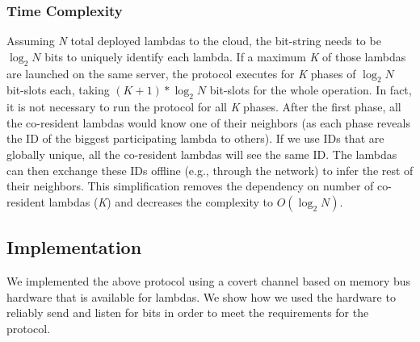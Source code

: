 \subsubsection{Time Complexity}
\label{sec:protocol:complexity}
Assuming \textit{N} total deployed lambdas to the cloud, the bit-string needs
to be $\log_2N$ bits to uniquely identify each lambda. If a maximum \textit{K}
of those lambdas are launched on the same server, the protocol executes for
\textit{K} phases of $\log_2N$ bit-slots each, taking $(K+1)*\log_2N$ bit-slots
for the whole operation.  In fact, it is not necessary to run the protocol for all \textit{K}
phases. After the first phase, all the co-resident lambdas would know one of
their neighbors (as each phase reveals the ID of the biggest participating
lambda to others).  If we use IDs that are globally unique, all the
co-resident lambdas will see the same ID. The lambdas can then exchange these IDs
offline (e.g., through the network) to infer the rest of their neighbors. This
simplification removes the dependency on number of co-resident lambdas
(\textit{K}) and decreases the complexity to $O(\log_2N)$.




\subsection{Implementation}
\label{sec:method:impl}
We implemented the above protocol using a covert channel based on memory bus hardware 
that is available for lambdas. We show how we used the hardware to reliably send and 
listen for bits in order to meet the requirements for the protocol. 

